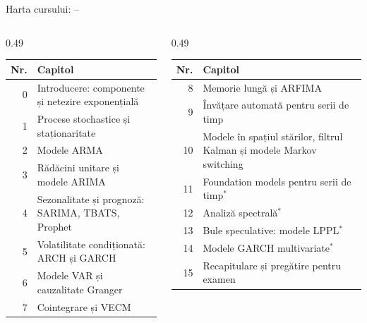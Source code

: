 \begin{frame}{Harta cursului: --}
\itemsize{\footnotesize}
\begin{columns}[T]
\begin{column}{0.49\textwidth}
\begin{center}
\footnotesize
\begin{tabular}{r>{\raggedright\arraybackslash}p{5.6cm}}
\toprule
\textbf{Nr.} & \textbf{Capitol} \\
\midrule
0 & Introducere: componente și netezire exponențială \\
1 & Procese stochastice și staționaritate \\
2 & Modele ARMA \\
3 & Rădăcini unitare și modele ARIMA \\
4 & Sezonalitate și prognoză: SARIMA, TBATS, Prophet \\
5 & Volatilitate condiționată: ARCH și GARCH \\
6 & Modele VAR și cauzalitate Granger \\
7 & Cointegrare și VECM \\
\bottomrule
\end{tabular}
\end{center}

\end{column}
\begin{column}{0.49\textwidth}
\begin{center}
\footnotesize
\begin{tabular}{r>{\raggedright\arraybackslash}p{5.6cm}}
\toprule
\textbf{Nr.} & \textbf{Capitol} \\
\midrule
8 & Memorie lungă și ARFIMA \\
9 & Învățare automată pentru serii de timp \\
10 & Modele în spațiul stărilor, filtrul Kalman și modele Markov switching \\
11 & Foundation models pentru serii de timp$^*$ \\
12 & Analiză spectrală$^*$ \\
13 & Bule speculative: modele LPPL$^*$ \\
14 & Modele GARCH multivariate$^*$ \\
15 & Recapitulare și pregătire pentru examen \\
\bottomrule
\end{tabular}
\end{center}


\end{column}
\end{columns}
\end{frame}
